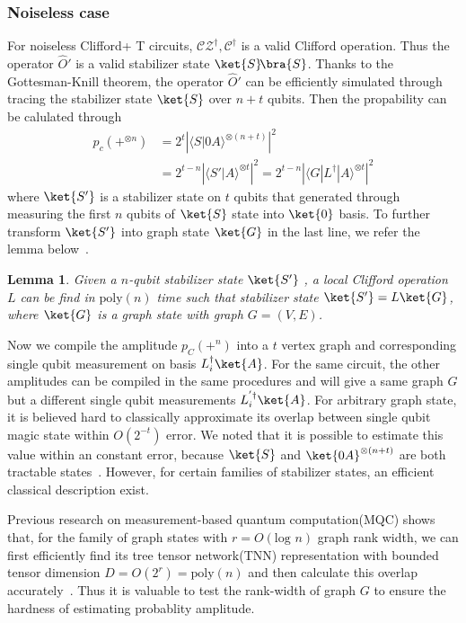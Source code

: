 \documentclass[aps,%
twocolumn,%
floatfix,%
pra,%
amsfonts,%
longbibliography,%
groupedaddress,%
superscriptaddress]{revtex4-2}%
\newtheorem{lemma}{Lemma}
\newcommand{\1}{\mathbbm{1}}
\begin{document}
\subsubsection{Noiseless case}
For noiseless Clifford+ T circuits, $\mathcal{CZ}^\dagger,\mathcal{C}^\dagger$ is a valid Clifford operation. Thus the operator $\hat O'$ is a valid stabilizer state $\ket{S}\!\bra{S}$. Thanks to the Gottesman-Knill theorem, the operator $\hat O'$ can be efficiently simulated through tracing the stabilizer state $\ket{S}$ over $n +t$ qubits. Then the propability can be calulated through
\begin{align}
    p_c(+^{\otimes n}) &={2^{t}} \left|\langle S | 0A \rangle^{\otimes (n+t)}\right|^2\\
    &={2^{t-n}} \left|\langle S' | A \rangle^{\otimes t}\right|^2 ={2^{t-n}} \left|\langle G|L^\dagger| A \rangle^{\otimes t}\right|^2
\end{align}
where $\ket{S'}$ is a stabilizer state on $t$ qubits that generated through measuring the first $n$ qubits of $\ket{S}$ state into $\ket{0}$ basis. To further transform $\ket{S'}$ into graph state $\ket{G}$ in the last line, we refer the lemma below~\cite{van2004graphical}.
\begin{lemma}\label{lemma: stabilizer_to_graph}
   Given a $n$-qubit stabilizer state $\ket{S'}$ , a local Clifford operation $L$ can be find in $\text{poly}(n)$ time such that stabilizer state $\ket{S'} = L \ket{G}$, where $\ket{G}$ is a graph state with graph $G = (V,E)$.  
\end{lemma}

Now we compile the amplitude  $p_C(+^n)$ into a $t$ vertex graph and corresponding single qubit measurement on basis $L_i^\dagger\ket{A}$.  
For the same circuit, the other amplitudes can be compiled in the same procedures and will give a same graph $G$ but a different single qubit measurements $L_i^{'\dagger} \ket{A}$. 
For arbitrary graph state, it is believed hard to classically approximate its overlap between single qubit magic state within $O(2^{-t})$ error. 
We noted that it is possible to estimate this value within an constant error, because $\ket{S}$ and $\ket{0A}^{\otimes (n+t)}$ are both tractable states~\cite{nest2009simulating}. 
However, for certain families of stabilizer states, an efficient classical description exist. 

Previous research on measurement-based quantum computation(MQC) shows that, for the family of graph states with $r =O(\text{log~} n)$ graph rank width, we can first efficiently find its tree tensor network(TNN) representation with bounded tensor dimension $D =O(2^r) = \text{poly}(n)$ and then calculate this overlap accurately~\cite{van2007classical}. Thus it is valuable to test the rank-width of graph $G$ to ensure the hardness of estimating probablity amplitude.
\end{document}
